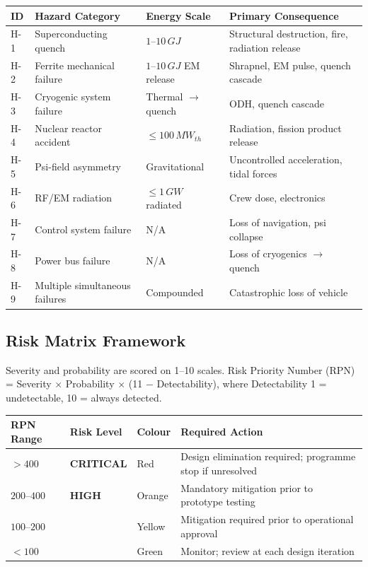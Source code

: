 \documentclass[11pt,a4paper]{article}
\newcommand{\Scrit}[1]{\cellcolor{risk-critical!40}\textbf{#1}}
\newcommand{\Shigh}[1]{\cellcolor{risk-high!40}\textbf{#1}}
\newcommand{\Smed}[1]{\cellcolor{risk-medium!40}{#1}}
\newcommand{\Slow}[1]{\cellcolor{risk-low!20}{#1}}
\begin{document}
\begin{longtable}{p{0.05\tw}p{0.30\tw}p{0.20\tw}p{0.35\tw}}
\toprule
\textbf{ID} & \textbf{Hazard Category} & \textbf{Energy Scale} &
\textbf{Primary Consequence} \\
\midrule
\endhead
H-1 & Superconducting quench & $1$--$10\,\si{GJ}$ &
  Structural destruction, fire, radiation release \\
H-2 & Ferrite mechanical failure & $1$--$10\,\si{GJ}$ EM release &
  Shrapnel, EM pulse, quench cascade \\
H-3 & Cryogenic system failure & Thermal $\to$ quench & ODH, quench cascade \\
H-4 & Nuclear reactor accident & $\leq 100\,\si{MW_{th}}$ & Radiation, fission
  product release \\
H-5 & Psi-field asymmetry & Gravitational & Uncontrolled acceleration,
  tidal forces \\
H-6 & RF/EM radiation & $\leq 1\,\si{GW}$ radiated & Crew dose, electronics \\
H-7 & Control system failure & N/A & Loss of navigation, psi collapse \\
H-8 & Power bus failure & N/A & Loss of cryogenics $\to$ quench \\
H-9 & Multiple simultaneous failures & Compounded & Catastrophic loss of vehicle \\
\bottomrule
\end{longtable}

\subsection{Risk Matrix Framework}

Severity and probability are scored on 1--10 scales. Risk Priority Number
(RPN) = Severity $\times$ Probability $\times$ (11 $-$ Detectability),
where Detectability 1 = undetectable, 10 = always detected.

\begin{longtable}{p{0.18\tw}p{0.12\tw}p{0.12\tw}p{0.48\tw}}
\toprule
\textbf{RPN Range} & \textbf{Risk Level} & \textbf{Colour} &
\textbf{Required Action} \\
\midrule
\endhead
$> 400$ & \Scrit{CRITICAL} & Red & Design elimination required;
  programme stop if unresolved \\
$200$--$400$ & \Shigh{HIGH} & Orange & Mandatory mitigation prior to
  prototype testing \\
$100$--$200$ & \Smed{MEDIUM} & Yellow & Mitigation required prior to
  operational approval \\
$< 100$ & \Slow{LOW} & Green & Monitor; review at each design iteration \\
\bottomrule
\end{longtable}
\end{document}
